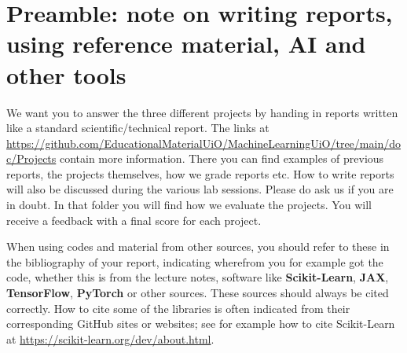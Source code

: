 \documentclass[11pt,a4paper]{article}
\begin{document}
\section*{Preamble: note on writing reports, using reference material, AI and other tools}

We want you to answer the three different projects by handing in
reports written like a standard scientific/technical report.  The links at
\url{https://github.com/EducationalMaterialUiO/MachineLearningUiO/tree/main/doc/Projects}
contain more information.  There you can find examples of previous reports,
the projects themselves, how we grade reports etc.  How to write reports will
also be discussed during the various lab sessions.  Please do ask us if you
are in doubt. In that folder you will find how we evaluate the projects. You will receive a feedback with a final score for each project.

When using codes and material from other sources, you should refer to these
in the bibliography of your report, indicating wherefrom you for example got
the code, whether this is from the lecture notes, software like
\textbf{Scikit-Learn}, \textbf{JAX}, \textbf{TensorFlow}, \textbf{PyTorch} or other
sources.  These sources should always be cited correctly.  How to cite some of
the libraries is often indicated from their corresponding GitHub sites or
websites; see for example how to cite Scikit-Learn at
\url{https://scikit-learn.org/dev/about.html}.
\end{document}
